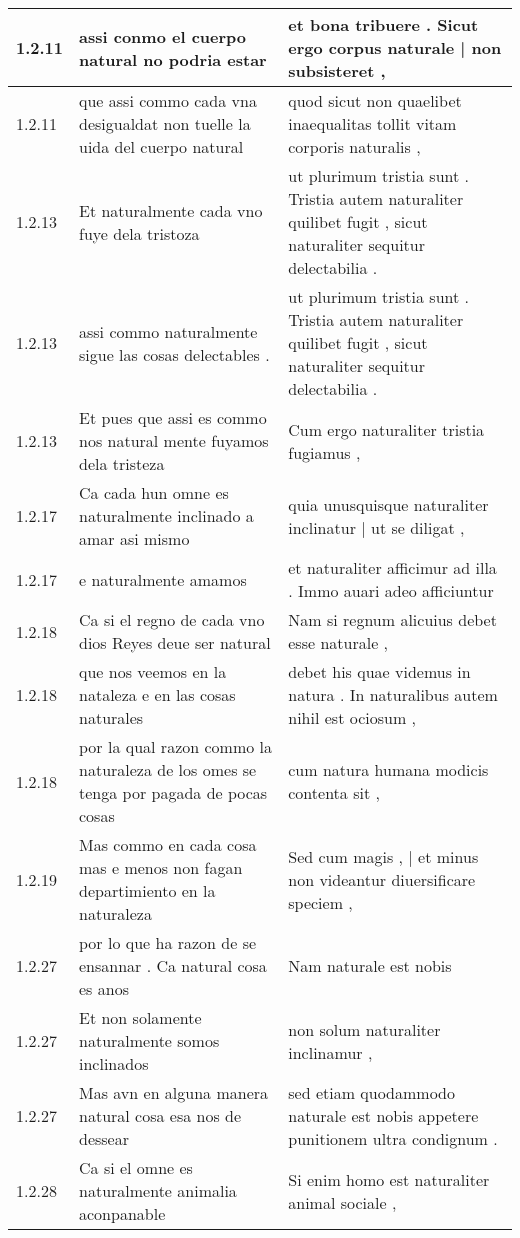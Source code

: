 \begin{tabular}{|p{1cm}|p{6.5cm}|p{6.5cm}|}
1.2.11 & assi conmo el cuerpo natural no podria estar & et bona tribuere . Sicut ergo corpus naturale | non subsisteret , \\\hline
1.2.11 & que assi commo cada vna desigualdat non tuelle la uida del cuerpo natural & quod sicut non quaelibet inaequalitas tollit vitam corporis naturalis , \\\hline
1.2.13 & Et naturalmente cada vno fuye dela tristoza & ut plurimum tristia sunt . Tristia autem naturaliter quilibet fugit , sicut naturaliter sequitur delectabilia . \\\hline
1.2.13 & assi commo naturalmente sigue las cosas delectables . & ut plurimum tristia sunt . Tristia autem naturaliter quilibet fugit , sicut naturaliter sequitur delectabilia . \\\hline
1.2.13 & Et pues que assi es commo nos natural mente fuyamos dela tristeza & Cum ergo naturaliter tristia fugiamus , \\\hline
1.2.17 & Ca cada hun omne es naturalmente inclinado a amar asi mismo & quia unusquisque naturaliter inclinatur | ut se diligat , \\\hline
1.2.17 & e naturalmente amamos & et naturaliter afficimur ad illa . Immo auari adeo afficiuntur \\\hline
1.2.18 & Ca si el regno de cada vno dios Reyes deue ser natural & Nam si regnum alicuius debet esse naturale , \\\hline
1.2.18 & que nos veemos en la nataleza e en las cosas naturales & debet his quae videmus in natura . In naturalibus autem nihil est ociosum , \\\hline
1.2.18 & por la qual razon commo la naturaleza de los omes se tenga por pagada de pocas cosas & cum natura humana modicis contenta sit , \\\hline
1.2.19 & Mas commo en cada cosa mas e menos non fagan departimiento en la naturaleza & Sed cum magis , | et minus non videantur diuersificare speciem , \\\hline
1.2.27 & por lo que ha razon de se ensannar . Ca natural cosa es anos & Nam naturale est nobis \\\hline
1.2.27 & Et non solamente naturalmente somos inclinados & non solum naturaliter inclinamur , \\\hline
1.2.27 & Mas avn en alguna manera natural cosa esa nos de dessear & sed etiam quodammodo naturale est nobis appetere punitionem ultra condignum . \\\hline
1.2.28 & Ca si el omne es naturalmente animalia aconpanable & Si enim homo est naturaliter animal sociale , \\\hline

\end{tabular}
